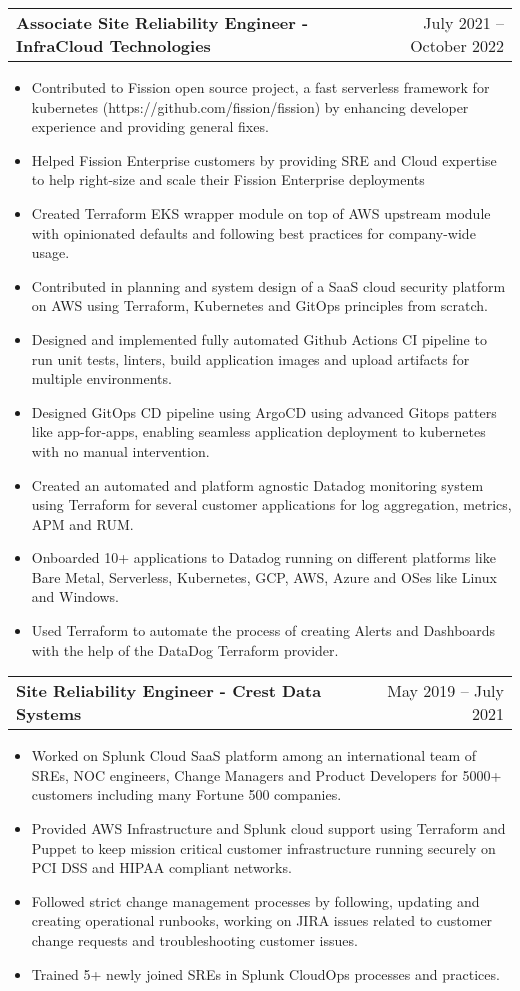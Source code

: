 \documentclass[letterpaper,11pt]{article}
\makeatletter
\newcommand{\resumeItem}[1]{
  \item\small{
    {#1 \vspace{-2pt}}
  }
}
\newcommand{\resumeSubheading}[2]{
  \vspace{-2pt}\item
    \begin{tabular*}{0.97\textwidth}[t]{l@{\extracolsep{\fill}}r}
      \textbf{#1} & #2 \\
    \end{tabular*}\vspace{-7pt}
}
\newcommand{\resumeItemListStart}{\begin{itemize}}
\newcommand{\resumeItemListEnd}{\end{itemize}\vspace{-5pt}}
\makeatother
\begin{document}
    \resumeSubheading
      {Associate Site Reliability Engineer - InfraCloud Technologies}{July 2021 -- October 2022}
      \resumeItemListStart
        \resumeItem{Contributed to Fission open source project, a fast serverless framework for kubernetes (https://github.com/fission/fission) by enhancing developer experience and providing general fixes.}
        \resumeItem{Helped Fission Enterprise customers by providing SRE and Cloud expertise to help right-size and scale their Fission Enterprise deployments}
        \resumeItem{Created Terraform EKS wrapper module on top of AWS upstream module with opinionated defaults and following best practices for company-wide usage.}
        \resumeItem{Contributed in planning and system design of a SaaS cloud security platform on AWS using Terraform, Kubernetes and GitOps principles from scratch.}
        \resumeItem{Designed and implemented fully automated Github Actions CI pipeline to run unit tests, linters, build application images and upload artifacts for multiple environments.}
        \resumeItem{Designed GitOps CD pipeline using ArgoCD using advanced Gitops patters like app-for-apps, enabling seamless application deployment to kubernetes with no manual intervention.}
        \resumeItem{Created an automated and platform agnostic Datadog monitoring system using Terraform for several customer applications for log aggregation, metrics, APM and RUM.}
        \resumeItem{Onboarded 10+ applications to Datadog running on different platforms like Bare Metal, Serverless, Kubernetes, GCP, AWS, Azure and OSes like Linux and Windows.}
        \resumeItem{Used Terraform to automate the process of creating Alerts and Dashboards with the help of the DataDog Terraform provider.}
     \resumeItemListEnd
    \resumeSubheading
      {Site Reliability Engineer - Crest Data Systems}{May 2019 -- July 2021}
      \resumeItemListStart
        \resumeItem{Worked on Splunk Cloud SaaS platform among an international team of SREs, NOC engineers, Change Managers and Product Developers for 5000+ customers including many Fortune 500 companies.}
        \resumeItem{Provided AWS Infrastructure and Splunk cloud support using Terraform and Puppet to keep mission critical customer infrastructure running securely on PCI DSS and HIPAA compliant networks.}
        \resumeItem{Followed strict change management processes by following, updating and creating operational runbooks, working on JIRA issues related to customer change requests and troubleshooting customer issues.}
        \resumeItem{Trained 5+ newly joined SREs in Splunk CloudOps processes and practices.}
      \resumeItemListEnd
    
\end{document}
